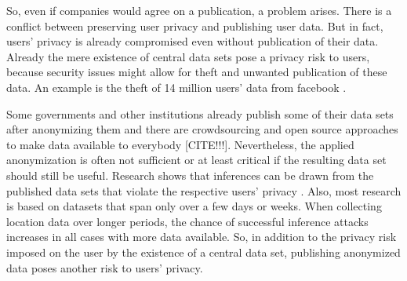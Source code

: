 So, even if companies would agree on a publication, a problem arises.
There is a conflict between preserving user privacy and publishing user data.
But in fact, users' privacy is already compromised even without publication of their data. Already the mere existence of central data sets pose a privacy risk to users, because security issues might allow for theft and unwanted publication of these data.
An example is the theft of 14 million users' data from facebook \parencite{facebook}.

Some governments and other institutions already publish some of their data sets after anonymizing them 
and there are crowdsourcing and open source approaches to make data available to everybody [CITE!!!]. 
Nevertheless, the applied anonymization is often not sufficient or at least critical if the resulting data set should still be useful. Research shows that inferences can be drawn from the published data sets that violate the respective users' privacy \parencite{cellphone, twitter}. Also, most research is based on datasets that span only over a few days or weeks. When collecting location data over longer periods, the chance of successful inference attacks increases in all cases with more data available. So, in addition to the privacy risk imposed on the user by the existence of a central data set, publishing anonymized data poses another risk to users' privacy.


